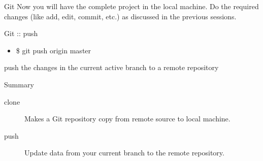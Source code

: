 \documentclass[14pt]{beamer}
\begin{document}
\begin{frame}{Git}
Now you will have the complete project in the local machine. Do the required changes (like add, edit, commit, etc.) as discussed in the previous sessions.
\end{frame}

\begin{frame}{Git :: push}
\begin{itemize}
\item \$ git push origin master
\end{itemize}
\begin{block}{}
push the changes in the current active branch to a remote repository
\end{block}
\end{frame}

\begin{frame}{Summary}
\begin{description}
\item [clone] Makes a Git repository copy from remote source to local machine.
\item [push] Update data from your current branch to the remote repository.
\end{description}
\end{frame}
\end{document}
